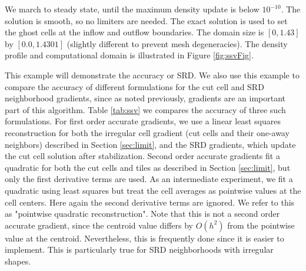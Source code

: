 We march to steady state, until the maximum density update is 
below $10^{-10}$.  
The solution is smooth, so no limiters are needed.
The exact solution is used to set the ghost cells at the inflow and
outflow boundaries. The domain size is $[0,1.43]$ by $[0.0,1.4301]$ 
(slightly different to prevent mesh  degeneracies).  
The density profile and computational domain is illustrated in Figure
\ref{fig:ssvFig}.


This example will demonstrate the accuracy or SRD.
We also use this example to compare the accuracy of different
formulations for the cut cell and SRD neighborhood  gradients, since
as noted previously, gradients are an important part of this algorithm.
Table \ref{tab:ssv} we compares the accuracy of three such formulations.
For first order accurate gradients, we use a linear least squares 
reconstruction for both the irregular cell gradient (cut cells and their one-away neighbors) 
described in Section \ref{sec:limit}, and the SRD gradients, which 
update the cut cell solution after stabilization. Second order accurate 
gradients fit a quadratic for both
the cut cells and tiles as described in Section \ref{sec:limit}, 
but only the first derivative terms are used. 
As an intermediate experiment, we  fit a quadratic using least squares but 
treat the
cell averages as pointwise values at the cell centers. Here again
the second derivative terms are ignored.  We refer to this as "pointwise
quadratic reconstruction". Note that this is not a
second order accurate gradient, since the centroid value differs by $O(h^2)$
from the pointwise value at the centroid. Nevertheless, this is frequently
done since it is easier to implement. This is particularly true  for SRD
neighborhoods with irregular shapes. 



